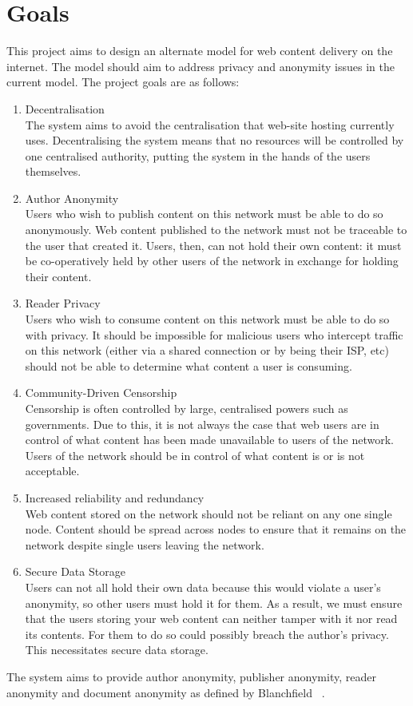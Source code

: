 \section{Goals}

This project aims to design an alternate model for web content delivery on the internet.
The model should aim to address privacy and anonymity issues in the current model.
The project goals are as follows:

\begin{enumerate}

    \item{Decentralisation \\
The system aims to avoid the centralisation that web-site hosting currently uses.
Decentralising the system means that no resources will be controlled by one centralised
authority, putting the system in the hands of the users themselves.
        }

    \item{Author Anonymity \\
Users who wish to publish content on this network must be able to do so anonymously.
Web content published to the network must not be traceable to the user that created it.
Users, then, can not hold their own content: it must be co-operatively held by other
users of the network in exchange for holding their content.
        }

    \item{Reader Privacy \\
Users who wish to consume content on this network must be able to do so with privacy.
It should be impossible for malicious users who intercept traffic on this network
(either via a shared connection or by being their ISP,  etc) should not be able to
determine what content a user is consuming.
        }

    \item{Community-Driven Censorship \\
Censorship is often controlled by large, centralised powers such as governments.
Due to this, it is not always the case that web users are in control of what content
has been made unavailable to users of the network. Users of the network should be
in control of what content is or is not acceptable.
        }

    \item{Increased reliability and redundancy \\
Web content stored on the network should not be reliant on any one single node.
Content should be spread across nodes to ensure that it remains on the network despite
single users leaving the network.
        }

    \item{Secure Data Storage \\
Users can not all hold their own data because this would violate a user’s anonymity,
so other users must hold it for them. As a result, we must ensure that the users storing
your web content can neither tamper with it nor read its contents. For them to do so could
possibly breach the author’s privacy. This necessitates secure data storage.
        }
\end{enumerate}

The system aims to provide author anonymity, publisher anonymity,
reader anonymity and document anonymity as defined by Blanchfield ~\cite{blanchfield}.

